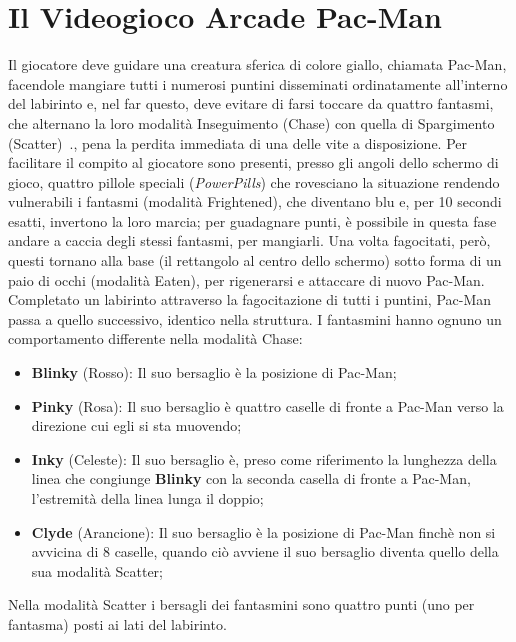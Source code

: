 \documentclass[12pt,a4paper]{report}
\begin{document}
\section{Il Videogioco Arcade Pac-Man}\label{se:gal}
Il giocatore deve guidare una creatura sferica di colore giallo, chiamata Pac-Man, facendole mangiare tutti i numerosi puntini disseminati ordinatamente all'interno del labirinto e, nel far questo, deve evitare di farsi toccare da quattro fantasmi, che alternano la loro modalità Inseguimento (Chase) con quella di Spargimento (Scatter)~\cite{pacmanai}., pena la perdita immediata di una delle vite a disposizione. Per facilitare il compito al giocatore sono presenti, presso gli angoli dello schermo di gioco, quattro pillole speciali (\emph{PowerPills}) che rovesciano la situazione rendendo vulnerabili i fantasmi (modalità Frightened), che diventano blu e, per 10 secondi esatti, invertono la loro marcia; per guadagnare punti, è possibile in questa fase andare a caccia degli stessi fantasmi, per mangiarli.
Una volta fagocitati, però, questi tornano alla base (il rettangolo al centro dello schermo) sotto forma di un paio di occhi (modalità Eaten), per rigenerarsi e attaccare di nuovo Pac-Man. Completato un labirinto attraverso la fagocitazione di tutti i puntini, Pac-Man passa a quello successivo, identico nella struttura. I fantasmini hanno ognuno un comportamento differente nella modalità Chase:
\begin{itemize}
\item \textbf{Blinky} (Rosso): Il suo bersaglio è la posizione di Pac-Man;
\item \textbf{Pinky} (Rosa): Il suo bersaglio è quattro caselle di fronte a Pac-Man verso la direzione cui egli si sta muovendo;
\item \textbf{Inky} (Celeste): Il suo bersaglio è, preso come riferimento la lunghezza della linea che congiunge \textbf{Blinky} con la seconda casella di fronte a Pac-Man, l'estremità della linea lunga il doppio;
\item \textbf{Clyde} (Arancione): Il suo bersaglio è la posizione di Pac-Man finchè non si avvicina di 8 caselle, quando ciò avviene il suo bersaglio diventa quello della sua modalità Scatter;
\end{itemize}
Nella modalità Scatter i bersagli dei fantasmini sono quattro punti (uno per fantasma) posti ai lati del labirinto.
\end{document}
